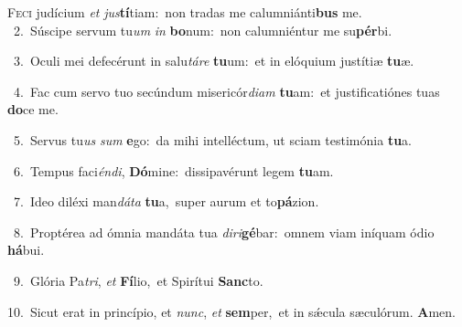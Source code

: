\lettrine{\initial\textcolor{\initialcolor}{F}}{eci} judícium \textit{et} \textit{jus}\-\textbf{tí}tiam:~\star non tradas me calumniánti\textbf{bus} me.\\
{\numbfont\textcolor{\numbcolor}{~2.}}~Súscipe servum tu\textit{um} \textit{in} \textbf{bo}\-num:~\star non calumniéntur me su\-\textbf{pér}\-bi.\par
{\numbfont\textcolor{\numbcolor}{~3.}}~Oculi mei defecérunt in salu\-\textit{tá}\-\textit{re} \textbf{tu}\-um:~\star et in elóquium justítiæ \textbf{tu}\-æ.\par
{\numbfont\textcolor{\numbcolor}{~4.}}~Fac cum servo tuo secúndum misericór\-\textit{di}\-\textit{am} \textbf{tu}\-am:~\star et justificatiónes tuas \textbf{do}\-ce me.\par
{\numbfont\textcolor{\numbcolor}{~5.}}~Servus tu\textit{us} \textit{sum} \textbf{e}\-go:~\star da mihi intelléctum, ut sciam testimónia \textbf{tu}\-a.\par
{\numbfont\textcolor{\numbcolor}{~6.}}~Tempus faci\-\textit{én}\-\textit{di}, \textbf{Dó}\-mine:~\star dissipavérunt legem \textbf{tu}\-am.\par
{\numbfont\textcolor{\numbcolor}{~7.}}~Ideo diléxi man\-\textit{dá}\-\textit{ta} \textbf{tu}\-a,~\star super aurum et to\-\textbf{pá}\-zion.\par
{\numbfont\textcolor{\numbcolor}{~8.}}~Proptérea ad ómnia mandáta tua \textit{di}\-\textit{ri}\textbf{gé}bar:~\star omnem viam iníquam ódio \textbf{há}\-bui.\par
{\numbfont\textcolor{\numbcolor}{~9.}}~Glória Pa\-\textit{tri}\-, \textit{et} \textbf{Fí}\-lio,~\star et Spirítui \textbf{Sanc}\-to.\par
{\numbfont\textcolor{\numbcolor}{10.}}~Sicut erat in princípio, et \textit{nunc}\-, \textit{et} \textbf{sem}\-per,~\star et in sǽcula sæculórum. \textbf{A}\-men.\par
